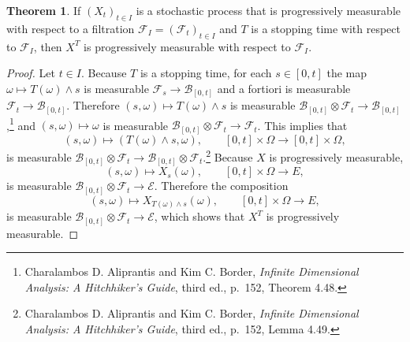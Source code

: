 \documentclass{article}
\theoremstyle{definition}
\newtheorem{theorem}{Theorem}
\theoremstyle{definition}
\begin{document}
\begin{theorem}
If $(X_t)_{t \in I}$ is a stochastic process  that is progressively measurable with respect
to a filtration $\mathscr{F}_I = (\mathscr{F}_t)_{t \in I}$ and 
 $T$ is a stopping time with respect
to $\mathscr{F}_I$, then
$X^T$ is  progressively measurable with respect to $\mathscr{F}_I$.
\end{theorem}
\begin{proof}
Let $t \in I$. 
Because $T$ is a stopping time, for each $s \in [0,t]$ the map $\omega \mapsto T(\omega) \wedge s$ 
is measurable $\mathscr{F}_s \to \mathscr{B}_{[0,t]}$ and a fortiori is measurable $\mathscr{F}_t \to  \mathscr{B}_{[0,t]}$. 
Therefore  $(s,\omega) \mapsto T(\omega) \wedge s$
is measurable $\mathscr{B}_{[0,t]} \otimes \mathscr{F}_t \to \mathscr{B}_{[0,t]}$,\footnote{Charalambos D. Aliprantis and Kim C. Border, {\em Infinite Dimensional Analysis:
A Hitchhiker's Guide}, third ed., p.~152, Theorem 4.48.} and 
$(s,\omega) \mapsto \omega$ is measurable $\mathscr{B}_{[0,t]} \otimes \mathscr{F}_t \to \mathscr{F}_t$. 
This implies that
\[
(s,\omega) \mapsto (T(\omega) \wedge s,\omega), \qquad [0,t] \times \Omega \to [0,t] \times \Omega,
\]
is measurable 
$\mathscr{B}_{[0,t]} \otimes \mathscr{F}_t \to \mathscr{B}_{[0,t]} \otimes \mathscr{F}_t$.\footnote{Charalambos D. Aliprantis and Kim C. Border, {\em Infinite Dimensional Analysis:
A Hitchhiker's Guide}, third ed., p.~152, Lemma 4.49.}
Because $X$ is progressively measurable,
\[
(s,\omega) \mapsto X_s(\omega), \qquad [0,t] \times \Omega \to E,
\]
is measurable $\mathscr{B}_{[0,t]} \otimes \mathscr{F}_t \to \mathscr{E}$.  Therefore
the composition 
\[
(s,\omega) \mapsto X_{T(\omega) \wedge s}(\omega), \qquad [0,t] \times \Omega \to E,
\]
is measurable $\mathscr{B}_{[0,t]} \otimes \mathscr{F}_t  \to \mathscr{E}$, which shows that
$X^T$ is progressively measurable.
\end{proof}
\end{document}
